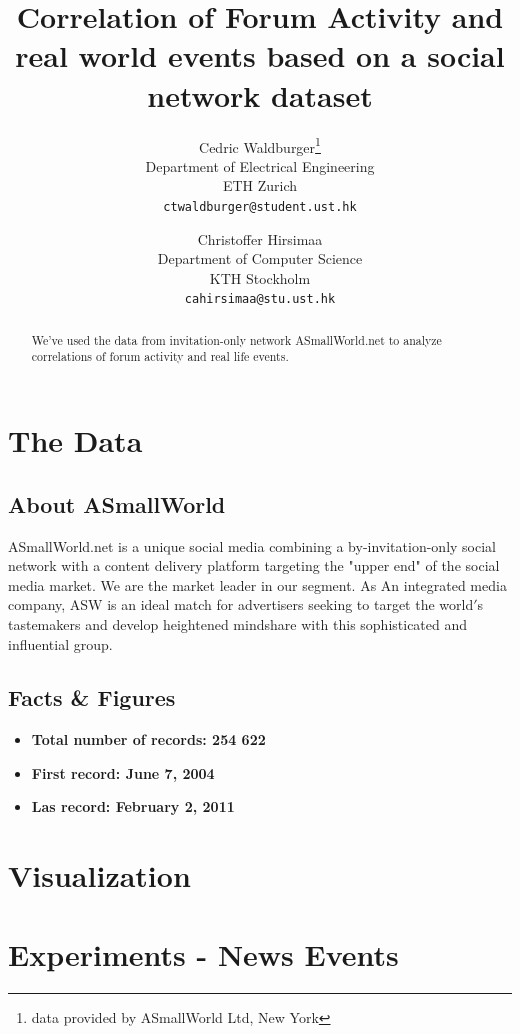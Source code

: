\documentclass[11pt,a4paper,english]{article}
\title{Correlation of Forum Activity and real world events based on a social network dataset}
\author{%
  Cedric Waldburger\thanks{data provided by ASmallWorld Ltd, New York}\\
  \small Department of Electrical Engineering\\
  \small ETH Zurich \\
  \small\texttt{ctwaldburger@student.ust.hk}
  \and
  Christoffer Hirsimaa\\
  \small Department of Computer Science\\
  \small KTH Stockholm\\
  \small\texttt{cahirsimaa@stu.ust.hk}
}
\begin{document}
  \maketitle

  \begin{abstract}
    We've used the data from invitation-only network ASmallWorld.net to analyze correlations of forum activity and real life events.
  \end{abstract}
  \newpage

  \tableofcontents\newpage

	\section{The Data}
		\subsection{About ASmallWorld}
			ASmallWorld.net is a unique social media combining a by-invitation-only social network with a content delivery platform targeting the "upper end" of the social media market. We are the market leader in our segment. As An integrated media company, ASW is an ideal match for advertisers seeking to target the world$\prime$s tastemakers and develop heightened mindshare with this sophisticated and influential group.
			
		\subsection{Facts \& Figures}
			\begin{itemize}
				\item \bf Total number of records: \rm 254 622
				\item \bf First record: \rm June 7, 2004
				\item \bf Las record: \rm February 2, 2011
			\end{itemize}
 \newpage
 		
	\section{Visualization}
	
	\section{Experiments - News Events}
\end{document}

